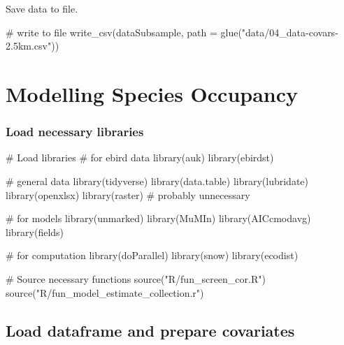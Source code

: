 \documentclass[
]{article}
\newenvironment{Shaded}{}{}
\newcommand{\CommentTok}[1]{\textcolor[rgb]{0.00,0.50,0.00}{#1}}
\newcommand{\DataTypeTok}[1]{#1}
\newcommand{\KeywordTok}[1]{\textcolor[rgb]{0.00,0.00,1.00}{#1}}
\newcommand{\NormalTok}[1]{#1}
\newcommand{\StringTok}[1]{\textcolor[rgb]{0.00,0.50,0.50}{#1}}
\begin{document}
Save data to file.

\begin{Shaded}
\begin{Highlighting}[]
\CommentTok{# write to file}
\KeywordTok{write_csv}\NormalTok{(dataSubsample, }\DataTypeTok{path =} \KeywordTok{glue}\NormalTok{(}\StringTok{"data/04_data-covars-2.5km.csv"}\NormalTok{))}
\end{Highlighting}
\end{Shaded}

\hypertarget{modelling-species-occupancy}{%
\section{Modelling Species Occupancy}\label{modelling-species-occupancy}}

\hypertarget{load-necessary-libraries}{%
\subsubsection{Load necessary libraries}\label{load-necessary-libraries}}

\begin{Shaded}
\begin{Highlighting}[]
\CommentTok{# Load libraries}
\CommentTok{# for ebird data}
\KeywordTok{library}\NormalTok{(auk)}
\KeywordTok{library}\NormalTok{(ebirdst)}

\CommentTok{# general data}
\KeywordTok{library}\NormalTok{(tidyverse)}
\KeywordTok{library}\NormalTok{(data.table)}
\KeywordTok{library}\NormalTok{(lubridate)}
\KeywordTok{library}\NormalTok{(openxlsx)}
\KeywordTok{library}\NormalTok{(raster) }\CommentTok{# probably unnecessary}

\CommentTok{# for models}
\KeywordTok{library}\NormalTok{(unmarked)}
\KeywordTok{library}\NormalTok{(MuMIn)}
\KeywordTok{library}\NormalTok{(AICcmodavg)}
\KeywordTok{library}\NormalTok{(fields)}

\CommentTok{# for computation}
\KeywordTok{library}\NormalTok{(doParallel)}
\KeywordTok{library}\NormalTok{(snow)}
\KeywordTok{library}\NormalTok{(ecodist)}

\CommentTok{# Source necessary functions}
\KeywordTok{source}\NormalTok{(}\StringTok{"R/fun_screen_cor.R"}\NormalTok{)}
\KeywordTok{source}\NormalTok{(}\StringTok{"R/fun_model_estimate_collection.r"}\NormalTok{)}
\end{Highlighting}
\end{Shaded}

\hypertarget{load-dataframe-and-prepare-covariates}{%
\subsection{Load dataframe and prepare covariates}\label{load-dataframe-and-prepare-covariates}}
\end{document}
